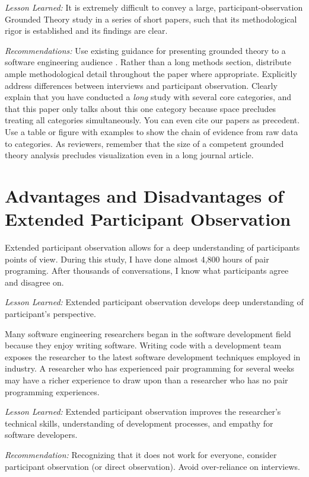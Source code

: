 \textit{Lesson Learned:} It is extremely difficult to convey a large, participant-observation Grounded Theory study in a series of short papers, such that its methodological rigor is established and its findings are clear.

\textit{Recommendations:} Use existing guidance for presenting grounded theory to a software engineering audience \cite{StolGroundedTheory}. Rather than a long methods section, distribute ample methodological detail throughout the paper where appropriate. Explicitly address differences between interviews and participant observation. Clearly explain that you have conducted a \textit{long} study with several core categories, and that this paper only talks about this one category because space precludes treating all categories simultaneously. You can even cite our papers as precedent. Use a table or figure with examples to show the chain of evidence from raw data to categories. As reviewers, remember that the size of a competent grounded theory analysis precludes visualization even in a long journal article.
\section{Advantages and Disadvantages of Extended Participant Observation}
\label{AdvantagesDisadvantages}
Extended participant observation allows for a deep understanding of participants points of view. During this study, I have done almost 4,800 hours of pair programing. After thousands of conversations, I know what participants agree and disagree on. 

\textit{Lesson Learned:} Extended participant observation develops deep understanding of participant's perspective.

Many software engineering researchers began in the software development field because they enjoy writing software. Writing code with a development team exposes the researcher to the latest software development techniques employed in industry. A researcher who has experienced pair programming for several weeks may have a richer experience to draw upon than a researcher who has no pair programming experiences.

\textit{Lesson Learned:} Extended participant observation improves the researcher's technical skills, understanding of development processes, and empathy for software developers.

\textit{Recommendation:} Recognizing that it does not work for everyone, consider participant observation (or direct observation). Avoid over-reliance on interviews.

